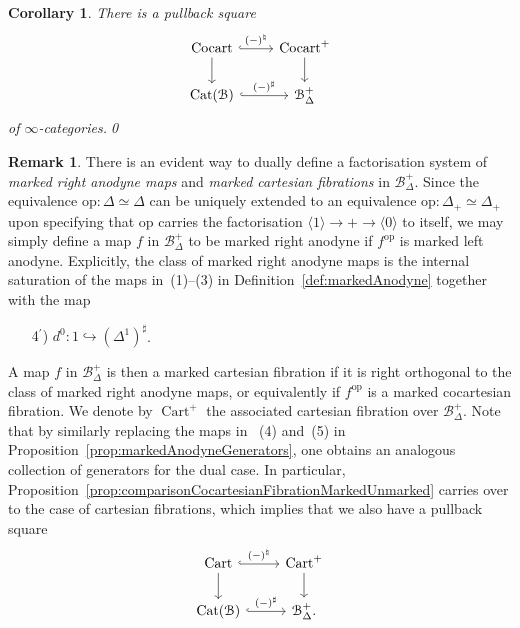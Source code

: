 \documentclass[reqno]{amsart}
\numberwithin{equation}{subsection}
\theoremstyle{plain}
\newtheorem{corollary}[equation]{Corollary}
\theoremstyle{definition}
\newtheorem{remark}[equation]{Remark}
\let\scr=\mathcal
\let\into=\hookrightarrow
\def\BB{\scr B}
\DeclareMathOperator{\Cat}{Cat}
\DeclareMathOperator{\Cart}{Cart}
\DeclareMathOperator{\Cocart}{Cocart}
\newcommand{\op}{\mathrm{op}}
\newcommand{\ord}[1]{\langle#1\rangle}
\newcommand{\mSimp}[1]{#1_{\Delta}^+}
\begin{document}
\begin{corollary}
	\label{cor:pullbackSquareCocartesianMarkedUnmarked}
	There is a pullback square
	\begin{equation*}
	\begin{tikzcd}
	\Cocart\arrow[r, hookrightarrow, "(-)^\natural"]\arrow[d] & \Cocart^+\arrow[d]\\
	\Cat(\BB)\arrow[r, hookrightarrow, "(-)^\sharp"] & \mSimp\BB
	\end{tikzcd}
	\end{equation*}
	of $\infty$-categories.\qed
\end{corollary}

\begin{remark}
	\label{rem:cartesianFibrationsAnodyneGenerators}
	There is an evident way to dually define a factorisation system of \emph{marked right anodyne maps} and \emph{marked cartesian fibrations} in $\mSimp\BB$. Since the equivalence $\op\colon \Delta\simeq\Delta$ can be uniquely extended to an equivalence $\op\colon\Delta_+\simeq\Delta_+$ upon specifying that $\op$ carries the factorisation $\ord{1}\to +\to \ord{0}$ to itself, we may simply define a map $f$ in $\mSimp\BB$ to be marked right anodyne if $f^{\op}$ is marked left anodyne. Explicitly, the class of marked right anodyne maps is the internal saturation of the maps in~(1)--(3) in Definition~\ref{def:markedAnodyne} together with the map
	\begin{enumerate}
	\item[4$^\prime$)] $d^0\colon 1\into (\Delta^1)^\sharp$.
	\end{enumerate}
	A map $f$ in $\mSimp\BB$ is then a marked cartesian fibration if it is right orthogonal to the class of marked right anodyne maps, or equivalently if $f^\op$ is a marked cocartesian fibration. We denote by $\Cart^+$ the associated cartesian fibration over $\mSimp\BB$. Note that by similarly replacing the maps in ~(4) and~(5) in Proposition~\ref{prop:markedAnodyneGenerators}, one obtains an analogous collection of generators for the dual case. In particular, Proposition~\ref{prop:comparisonCocartesianFibrationMarkedUnmarked} carries over to the case of cartesian fibrations, which implies that we also have a pullback square
	\begin{equation*}
	\begin{tikzcd}
	\Cart\arrow[r, hookrightarrow, "(-)^\natural"]\arrow[d] & \Cart^+\arrow[d]\\
	\Cat(\BB)\arrow[r, hookrightarrow, "(-)^\sharp"] & \mSimp\BB.
	\end{tikzcd}
	\end{equation*}
\end{remark}
\end{document}
